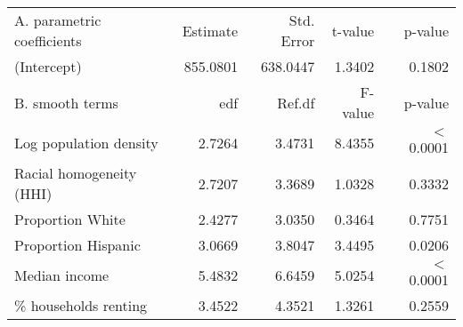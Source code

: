 \begin{table}[ht]
\centering
\begin{tabular}{lrrrr}
   \hline
A. parametric coefficients & Estimate & Std. Error & t-value & p-value \\ 
  (Intercept) & 855.0801 & 638.0447 & 1.3402 & 0.1802 \\ 
   \hline
B. smooth terms & edf & Ref.df & F-value & p-value \\ 
  Log population density & 2.7264 & 3.4731 & 8.4355 & $<$ 0.0001 \\ 
  Racial homogeneity (HHI) & 2.7207 & 3.3689 & 1.0328 & 0.3332 \\ 
  Proportion White & 2.4277 & 3.0350 & 0.3464 & 0.7751 \\ 
  Proportion Hispanic & 3.0669 & 3.8047 & 3.4495 & 0.0206 \\ 
  Median income & 5.4832 & 6.6459 & 5.0254 & $<$ 0.0001 \\ 
  \% households renting & 3.4522 & 4.3521 & 1.3261 & 0.2559 \\ 
   \hline
\end{tabular}
\caption{ } 
\label{Demographic GAM}
\end{table}
